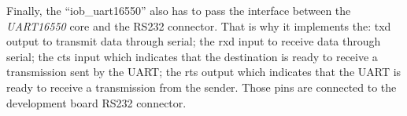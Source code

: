 \begin{table}[!ht]
  \centering
  \caption{\textit{UART16550} interface with \textit{IOb-SoC}.}
  \label{tab:wishbone_iob_soc}
\end{table}

Finally, the \enquote{iob\_uart16550} also has to pass the interface between the \textit{UART16550} core and the RS232 connector. That is why it implements the: txd output to transmit data through serial; the rxd input to receive data through serial; the cts input which indicates that the destination is ready to receive a transmission sent by the UART; the rts output which indicates that the UART is ready to receive a transmission from the sender. Those pins are connected to the development board RS232 connector.

